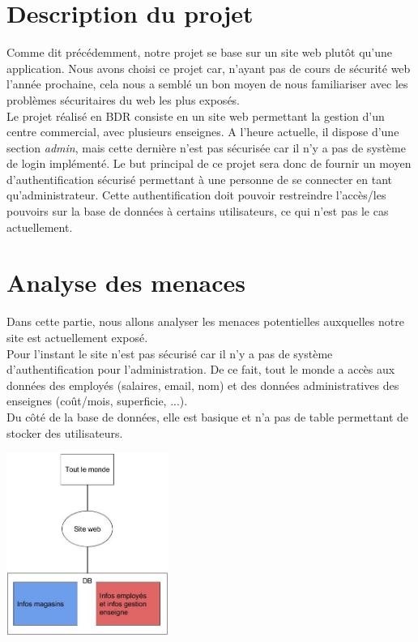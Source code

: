 \documentclass[a4paper]{article}
\begin{document}
\section{Description du projet}

Comme dit précédemment, notre projet se base sur un site web plutôt qu'une application. Nous avons choisi ce projet car, n'ayant pas de cours de sécurité web l'année prochaine, cela nous a semblé un bon moyen de nous familiariser avec les problèmes sécuritaires du web les plus exposés.\\
Le projet réalisé en BDR consiste en un site web permettant la gestion d'un centre commercial, avec plusieurs enseignes. A l'heure actuelle, il dispose d'une section \textit{admin}, mais cette dernière n'est pas sécurisée car il n'y a pas de système de login implémenté. Le but principal de ce projet sera donc de fournir un moyen d'authentification sécurisé permettant à une personne de se connecter en tant qu'administrateur. Cette authentification doit pouvoir restreindre l'accès/les pouvoirs sur la base de données à certains utilisateurs, ce qui n'est pas le cas actuellement.

\section{Analyse des menaces}

Dans cette partie, nous allons analyser les menaces potentielles auxquelles notre site est actuellement exposé.\\
Pour l'instant le site n'est pas sécurisé car il n'y a pas de système d'authentification pour l'administration. De ce fait, tout le monde a accès aux données des employés (salaires, email, nom) et des données administratives des enseignes (coût/mois, superficie, ...).\\
Du côté de la base de données, elle est basique et n'a pas de table permettant de stocker des utilisateurs.

\begin{center}
 \includegraphics[width=200px]{img/DFD_actuelle.jpg}
\end{center}
\end{document}
